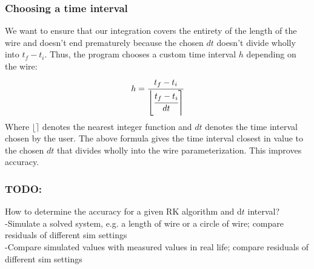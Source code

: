 \documentclass[12pt]{article}
\newcommand{\spaces}{\phantom{\qquad}}
\begin{document}
	\subsubsection*{Choosing a time interval}
	
	We want to ensure that our integration covers the entirety of the length of the wire and doesn't end prematurely because the chosen $dt$ doesn't divide wholly into $t_f - t_i$. Thus, the program chooses a custom time interval $h$ depending on the wire:
			$$ h = \cfrac{t_f - t_i}{\left \lfloor \cfrac{t_f - t_i}{dt}\right \rceil}$$
	Where $\lfloor \rceil$ denotes the nearest integer function and $dt$ denotes the time interval chosen by the user. The above formula gives the time interval closest in value to the chosen $dt$ that divides wholly into the wire parameterization. This improves accuracy.
	
	\subsubsection*{TODO:}
	
	How to determine the accuracy for a given RK algorithm and d$t$ interval? \\
	\spaces -Simulate a solved system, e.g. a length of wire or a circle of wire; compare residuals of different sim settings \\
	\spaces -Compare simulated values with measured values in real life; compare residuals of different sim settings \\
	\spaces 
	
	
\end{document}

